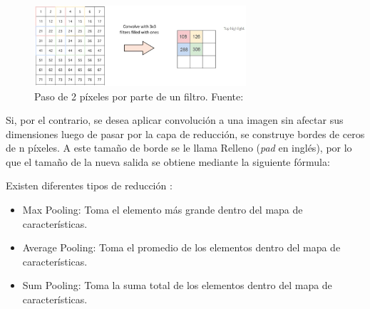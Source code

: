 \begin{itemize}
\begin{itemize}
\begin{itemize}
\begin{figure}[htbp]
\begin{center}
					\includegraphics[width=0.7\textwidth]{2/figures/stride_cnn.jpg}
					\caption{Paso de 2 píxeles por parte de un filtro. Fuente: \cite{tec_prabhu2018cnn}}
					\label{2:fig32}
				\end{center}
			\end{figure}
			
			Si, por el contrario, se desea aplicar convolución a una imagen sin afectar sus dimensiones luego de pasar por la capa de reducción, se construye bordes de ceros de n píxeles. A este tamaño de borde se le llama Relleno (\textit{pad} en inglés), por lo que el tamaño de la nueva salida se obtiene mediante la siguiente fórmula:
			
			Existen diferentes tipos de reducción \parencite{tec_prabhu2018cnn}:
			\begin{itemize}
				\item Max Pooling: Toma el elemento más grande dentro del mapa de características.
				\item Average Pooling: Toma el promedio de los elementos dentro del mapa de características.
				\item Sum Pooling: Toma la suma total de los elementos dentro del mapa de características.
			\end{itemize}
			

\end{itemize}
\end{itemize}
\end{itemize}
